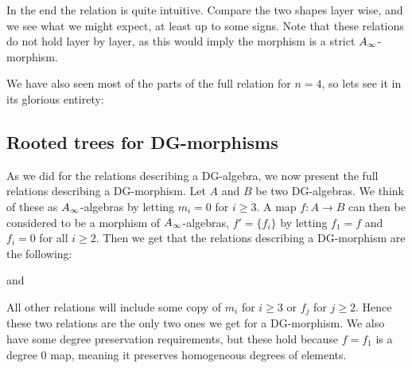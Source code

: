 In the end the relation is quite intuitive. Compare the two shapes layer wise, and we see what we might expect, at least up to some signs. Note that these relations do not hold layer by layer, as this would imply the morphism is a strict $A_{\infty}$-morphism. 

We have also seen most of the parts of the full relation for $n=4$, so lets see it in its glorious entirety:



\subsection*{Rooted trees for DG-morphisms}
As we did for the relations describing a DG-algebra, we now present the full relations describing a DG-morphism. Let $A$ and $B$ be two DG-algebras. We think of these as $A_{\infty}$-algebras by letting $m_i =0$ for $i\geq 3$. A map $f\colon A\longrightarrow B$ can then be considered to be a morphism of $A_{\infty}$-algebras, $f'=\{f_i\}$ by letting $f_1 = f$ and $f_i = 0$ for all $i\geq 2$. Then we get that the relations describing a DG-morphism are the following:


and 


All other relations will include some copy of $m_i$ for $i\geq 3$ or $f_j$ for $j\geq 2$. Hence these two relations are the only two ones we get for a DG-morphism. We also have some degree preservation requirements, but these hold because $f=f_1$ is a degree $0$ map, meaning it preserves homogeneous degrees of elements. 



